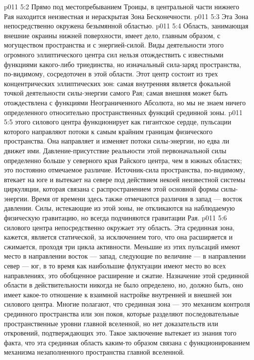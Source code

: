 \vs p011 5:2 \bibnobreakspace Прямо под местопребыванием Троицы, в центральной части нижнего Рая находится неизвестная и нераскрытая Зона Бесконечности.
\vs p011 5:3 \pc {}\bibnobreakspace Эта Зона непосредственно окружена безымянной областью.
\vs p011 5:4 \pc {}\bibnobreakspace Область, занимающая внешние окраины нижней поверхности, имеет дело, главным образом, с могуществом пространства и с энергией\hyp{}силой. Виды деятельности этого огромного эллиптического центра сил нельзя отождествить с известными функциями какого\hyp{}либо триединства, но изначальный сила\hyp{}заряд пространства, по\hyp{}видимому, сосредоточен в этой области. Этот центр состоит из трех концентрических эллиптических зон: самая внутренняя является фокальной точкой деятельности силы\hyp{}энергии самого Рая; самая внешняя может быть отождествлена с функциями Неограниченного Абсолюта, но мы не знаем ничего определенного относительно пространственных функций срединной зоны.
\vs p011 5:5 \pc {} этого силового центра функционирует как гигантское сердце, пульсации которого направляют потоки к самым крайним границам физического пространства. Она направляет и изменяет потоки силы\hyp{}энергии, но едва ли движет ими. Давление\hyp{}присутствие реальности этой первоначальной силы определенно больше у северного края Райского центра, чем в южных областях; это постоянно отмечаемое различие. Источник\hyp{}сила пространства, по\hyp{}видимому, втекает на юге и вытекает на севере под действием некоей неизвестной системы циркуляции, которая связана с распространением этой основной формы силы\hyp{}энергии. Время от времени здесь также отмечаются различия в запад --- восток давлении. Силы, истекающие из этой зоны, не откликаются на наблюдаемую физическую гравитацию, но всегда подчиняются гравитации Рая.
\vs p011 5:6 \pc {} силового центра непосредственно окружает эту область. Эта срединная зона, кажется, является статической, за исключением того, что она расширяется и сжимается, проходя три цикла активности. Меньшие из этих пульсаций имеют место в направлении восток --- запад, следующие по величине --- в направлении север --- юг, в то время как наибольшие флуктуации имеют место во всех направлениях, это обобщенное расширение и сжатие. Назначение этой срединной области в действительности никогда не было определено, но, должно быть, оно имеет какое\hyp{}то отношение к взаимной настройке внутренней и внешней зон силового центра. Многие полагают, что срединная зона --- это механизм контроля срединного пространства или зон покоя, которые разделяют последовательные пространственные уровни главной вселенной, но нет доказательств или откровений, подтверждающих это. Такое заключение вытекает из знания того факта, что эта срединная область каким\hyp{}то образом связана с функционированием механизма незаполненного пространства главной вселенной.
